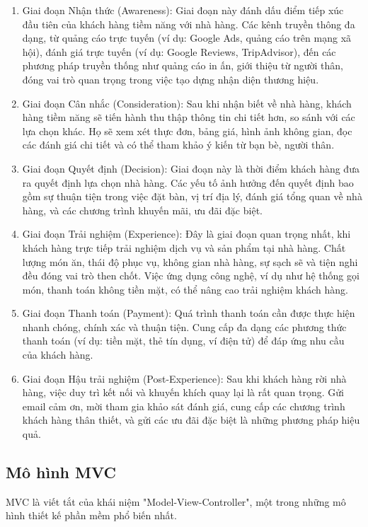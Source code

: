 \begin{enumerate}
	\item Giai đoạn Nhận thức (Awareness): Giai đoạn này đánh dấu điểm tiếp xúc đầu tiên của khách hàng tiềm năng với nhà hàng. Các kênh truyền thông đa dạng, từ quảng cáo trực tuyến (ví dụ: Google Ads, quảng cáo trên mạng xã hội), đánh giá trực tuyến (ví dụ: Google Reviews, TripAdvisor), đến các phương pháp truyền thống như quảng cáo in ấn, giới thiệu từ người thân, đóng vai trò quan trọng trong việc tạo dựng nhận diện thương hiệu.
	\item Giai đoạn Cân nhắc (Consideration): Sau khi nhận biết về nhà hàng, khách hàng tiềm năng sẽ tiến hành thu thập thông tin chi tiết hơn, so sánh với các lựa chọn khác. Họ sẽ xem xét thực đơn, bảng giá, hình ảnh không gian, đọc các đánh giá chi tiết và có thể tham khảo ý kiến từ bạn bè, người thân.
	\item Giai đoạn Quyết định (Decision): Giai đoạn này là thời điểm khách hàng đưa ra quyết định lựa chọn nhà hàng. Các yếu tố ảnh hưởng đến quyết định bao gồm sự thuận tiện trong việc đặt bàn, vị trí địa lý, đánh giá tổng quan về nhà hàng, và các chương trình khuyến mãi, ưu đãi đặc biệt.
	\item Giai đoạn Trải nghiệm (Experience): Đây là giai đoạn quan trọng nhất, khi khách hàng trực tiếp trải nghiệm dịch vụ và sản phẩm tại nhà hàng. Chất lượng món ăn, thái độ phục vụ, không gian nhà hàng, sự sạch sẽ và tiện nghi đều đóng vai trò then chốt. Việc ứng dụng công nghệ, ví dụ như hệ thống gọi món, thanh toán không tiền mặt, có thể nâng cao trải nghiệm khách hàng.
	\item Giai đoạn Thanh toán (Payment): Quá trình thanh toán cần được thực hiện nhanh chóng, chính xác và thuận tiện. Cung cấp đa dạng các phương thức thanh toán (ví dụ: tiền mặt, thẻ tín dụng, ví điện tử) để đáp ứng nhu cầu của khách hàng.
	\item Giai đoạn Hậu trải nghiệm (Post-Experience): Sau khi khách hàng rời nhà hàng, việc duy trì kết nối và khuyến khích quay lại là rất quan trọng. Gửi email cảm ơn, mời tham gia khảo sát đánh giá, cung cấp các chương trình khách hàng thân thiết, và gửi các ưu đãi đặc biệt là những phương pháp hiệu quả.
\end{enumerate}

\subsection{Mô hình MVC}
MVC là viết tắt của khái niệm "Model-View-Controller", một trong những mô hình thiết kế phần mềm phổ biến nhất.\\

